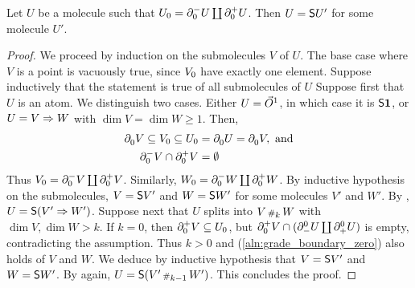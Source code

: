 \begin{lem} \label{lem:has_two_point_is_susp}
    Let \( U \) be a molecule such that \( \gr{0}{U} = \bd{0}{-} U \coprod \bd{0}{+} U \).
    Then \( U = \sus{U'} \) for some molecule \( U' \).
\end{lem}
\begin{proof}
    We proceed by induction on the submolecules \( V \) of \( U \).
    The base case where \( V \) is a point is vacuously true, since \( \gr{0}{V} \) have exactly one element.
    Suppose inductively that the statement is true of all submolecules of \( U \)
    Suppose first that \( U \) is an atom.
    We distinguish two cases.
    Either \( U = \dglobe{1} \), in which case it is \( \sus{\pt} \), or \( U = V \celto W \) with \( \dim V = \dim W \geq 1 \).
    Then, 
    \begin{align} 
         \bd{0}{} V \subseteq \gr{0}{V} \subseteq \gr{0}{U} &= \bd{0}{} U = \bd{0}{} V, \text{ and} \nonumber\\
         \bd{0}{-} V \cap \bd{0}{+} V &= \emptyset \label{aln:grade_boundary_zero}
    \end{align}
    Thus \( \gr{0}{V} = \bd{0}{-} V \coprod \bd{0}{+} V\).
    Similarly, \( \gr{0}{W} = \bd{0}{-} W \coprod \bd{0}{+} W \).
    By inductive hypothesis on the submolecules, \( V = \sus{V'} \) and \( W = \sus{W'} \) for some molecules \( V' \) and \( W' \).
    By \cite[Proposition 7.3.16]{hadzihasanovic2024combinatorics}, \( U = \sus{(V' \celto W')} \).
    Suppose next that \( U \) splits into \( V \cp{k} W \) with \( \dim V, \dim W > k \).
    If \( k = 0 \), then \( \bd{0}{+} V \subseteq \gr{0}{U} \), but \( \bd{0}{+} V \cap (\bd{-}{0} U \coprod \bd{+}{0} U) \) is empty, contradicting the assumption.
    Thus \( k > 0 \) and (\ref{aln:grade_boundary_zero}) also holds of \( V \) and \( W \).
    We deduce by inductive hypothesis that \( V = \sus{V'} \) and \( W = \sus{W'} \).
    By \cite[Proposition 7.3.16]{hadzihasanovic2024combinatorics} again, \( U = \sus{(V' \cp{k - 1} W')} \).
    This concludes the proof.
\end{proof}

